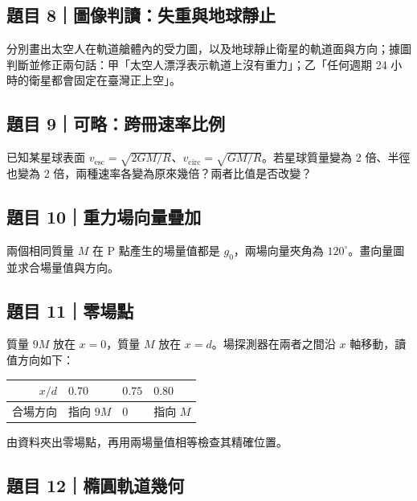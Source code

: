 \documentclass[11pt,a4paper]{article}
\newcounter{none}
\begin{document}
\subsection{題目 8｜圖像判讀：失重與地球靜止}\label{ux984cux76ee-8ux5716ux50cfux5224ux8b80ux5931ux91cdux8207ux5730ux7403ux975cux6b62}

分別畫出太空人在軌道艙體內的受力圖，以及地球靜止衛星的軌道面與方向；據圖判斷並修正兩句話：甲「太空人漂浮表示軌道上沒有重力」；乙「任何週期 24 小時的衛星都會固定在臺灣正上空」。

\subsection{題目 9｜可略：跨冊速率比例}\label{ux984cux76ee-9ux53efux7565ux8de8ux518aux901fux7387ux6bd4ux4f8b}

已知某星球表面 \(v_{\mathrm{esc}}=\sqrt{2GM/R}\)、\(v_{\mathrm{circ}}=\sqrt{GM/R}\)。若星球質量變為 2 倍、半徑也變為 2 倍，兩種速率各變為原來幾倍？兩者比值是否改變？

\subsection{題目 10｜重力場向量疊加}\label{ux984cux76ee-10ux91cdux529bux5834ux5411ux91cfux758aux52a0}

兩個相同質量 \(M\) 在 P 點產生的場量值都是 \(g_0\)，兩場向量夾角為 \(120^\circ\)。畫向量圖並求合場量值與方向。

\subsection{題目 11｜零場點}\label{ux984cux76ee-11ux96f6ux5834ux9ede}

質量 \(9M\) 放在 \(x=0\)，質量 \(M\) 放在 \(x=d\)。場探測器在兩者之間沿 \(x\) 軸移動，讀值方向如下：

{\def\LTcaptype{none} %
\begin{longtable}[]{@{}rlll@{}}
\toprule\noalign{}
\(x/d\) & \(0.70\) & \(0.75\) & \(0.80\) \\
\midrule\noalign{}
\endhead
\bottomrule\noalign{}
\endlastfoot
合場方向 & 指向 \(9M\) & \(0\) & 指向 \(M\) \\
\end{longtable}
}

由資料夾出零場點，再用兩場量值相等檢查其精確位置。

\subsection{題目 12｜橢圓軌道幾何}\label{ux984cux76ee-12ux6a62ux5713ux8eccux9053ux5e7eux4f55}
\end{document}
